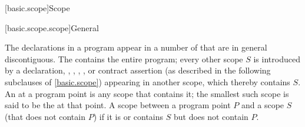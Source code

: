 [basic.scope]{Scope}%

[basic.scope.scope]{General}

\pnum
The declarations in a program appear in a number of 
that are in general discontiguous.
The  contains the entire program;
every other scope $S$ is introduced by a
declaration,
,
,
,
, or
contract assertion
(as described in the following subclauses of \ref{basic.scope})
appearing in another scope, which thereby contains $S$.
An  at a program point is any scope that contains it;
the smallest such scope is said to be the 
at that point.
A scope 
between a program point $P$ and a scope $S$
(that does not contain $P$) if it is or contains $S$ but does not contain $P$.

